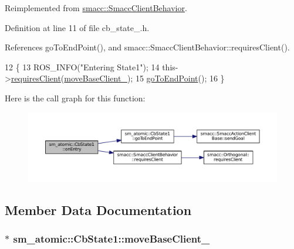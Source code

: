 Reimplemented from \hyperlink{classsmacc_1_1SmaccClientBehavior_a7962382f93987c720ad432fef55b123f}{smacc\+::\+Smacc\+Client\+Behavior}.



Definition at line 11 of file cb\+\_\+state\+\_.\+h.



References go\+To\+End\+Point(), and smacc\+::\+Smacc\+Client\+Behavior\+::requires\+Client().


\begin{DoxyCode}
12     \{
13         ROS\_INFO(\textcolor{stringliteral}{"Entering State1"});
14         this->\hyperlink{classsmacc_1_1SmaccClientBehavior_adc21bbd45d36bd81ca6f778ed161807a}{requiresClient}(\hyperlink{structsm__atomic_1_1CbState1_a55e7ec48d2662baa9c40ee3c54fb5a64}{moveBaseClient\_});
15         \hyperlink{structsm__atomic_1_1CbState1_ae27f060a983c1128d3c928eed45eae6b}{goToEndPoint}();
16     \}
\end{DoxyCode}


Here is the call graph for this function\+:
\nopagebreak
\begin{figure}[H]
\begin{center}
\leavevmode
\includegraphics[width=350pt]{structsm__atomic_1_1CbState1_afdd883f27c415d8485658c74fae1008e_cgraph}
\end{center}
\end{figure}




\subsection{Member Data Documentation}
\subsubsection[{\texorpdfstring{move\+Base\+Client\+\_\+}{moveBaseClient_}}]{$\ast$ sm\+\_\+atomic\+::\+Cb\+State1\+::move\+Base\+Client\+\_\+}\hypertarget{structsm__atomic_1_1CbState1_a55e7ec48d2662baa9c40ee3c54fb5a64}{}\label{structsm__atomic_1_1CbState1_a55e7ec48d2662baa9c40ee3c54fb5a64}


